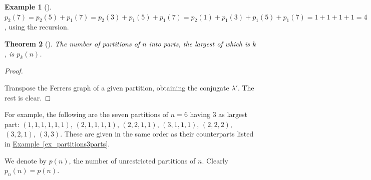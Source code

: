 \documentclass[10pt,]{book}
\theoremstyle{plain}
\newtheorem{theorem}{Theorem}[section]
\theoremstyle{definition}
\theoremstyle{definition}
\newtheorem{example}[theorem]{Example}
\theoremstyle{definition}
\theoremstyle{definition}
\numberwithin{equation}{chapter}
\begin{document}
\begin{example}[]\label{example-29}
\hypertarget{p-1227}{}%
\(p_2(7) = p_2(5) + p_1(7) = p_2(3) + p_1(5) + p_1(7) = p_2(1) + p_1(3) + p_1(5) + p_1(7) = 1 + 1 + 1 + 1 = 4\), using the recursion.%
\end{example}
\begin{theorem}[{}]\label{thm-largestpart}
\hypertarget{p-1228}{}%
The number of partitions of \(n\) into parts, the largest of which is \(k\), is \(p_k(n)\).%
\end{theorem}
\begin{proof}\hypertarget{proof-16}{}
\hypertarget{p-1229}{}%
Transpose the Ferrers graph of a given partition, obtaining the conjugate \(\lambda'\).  The rest is clear.%
\end{proof}
\hypertarget{p-1230}{}%
For example, the following are the seven partitions of \(n = 6\) having 3 as largest part: \((1,1,1,1,1,1)\), \((2,1,1,1,1)\), \((2,2,1,1)\), \((3,1,1,1)\), \((2,2,2)\), \((3,2,1)\), \((3,3)\).  These are given in the same order as their counterparts listed in \hyperref[ex_partitions3parts]{Example~\ref{ex_partitions3parts}}.%
\par
\hypertarget{p-1231}{}%
We denote by \(p(n)\), the number of unrestricted partitions of \(n\).  Clearly \(p_n(n) = p(n)\).%
\typeout{************************************************}
\typeout{************************************************}
\end{document}
